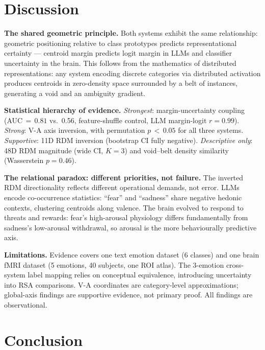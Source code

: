 \documentclass{article}
\begin{document}
\section{Discussion}

\textbf{The shared geometric principle.}
Both systems exhibit the same relationship: geometric positioning relative to class
prototypes predicts representational certainty --- centroid margin predicts logit margin
in LLMs and classifier uncertainty in the brain.
This follows from the mathematics of distributed representations: any system encoding
discrete categories via distributed activation produces centroids in zero-density space
surrounded by a belt of instances, generating a void and an ambiguity gradient.

\textbf{Statistical hierarchy of evidence.}
\emph{Strongest}: margin-uncertainty coupling (AUC$\,{=}\,0.81$ vs.\ 0.56, feature-shuffle
control, LLM margin-logit $r\!=\!0.99$).
\emph{Strong}: V-A axis inversion, with permutation $p\,{<}\,0.05$ for all three systems.
\emph{Supportive}: 11D RDM inversion (bootstrap CI fully negative).
\emph{Descriptive only}: 48D RDM magnitude (wide CI, $K\!=\!3$) and void--belt density
similarity (Wasserstein $p\!=\!0.46$).

\textbf{The relational paradox: different priorities, not failure.}
The inverted RDM directionality reflects different operational demands, not error.
LLMs encode co-occurrence statistics: ``fear'' and ``sadness'' share negative hedonic
contexts, clustering centroids along valence.
The brain evolved to respond to threats and rewards: fear's high-arousal physiology
differs fundamentally from sadness's low-arousal withdrawal, so arousal is the more
behaviourally predictive axis.

\textbf{Limitations.}
Evidence covers one text emotion dataset (6 classes) and one brain fMRI dataset
(5 emotions, 40 subjects, one ROI atlas).
The 3-emotion cross-system label mapping relies on conceptual equivalence, introducing
uncertainty into RSA comparisons.
V-A coordinates are category-level approximations; global-axis findings are supportive
evidence, not primary proof.
All findings are observational.

\section{Conclusion}
\end{document}
